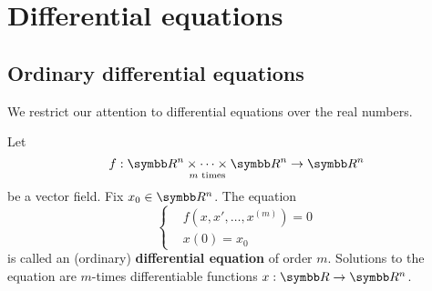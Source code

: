 \section{Differential equations}\label{sec:diffeq}
\subsection{Ordinary differential equations}\label{subsec:ordinary_differential_equations}

\begin{remark}\label{remark:real_ode}
  We restrict our attention to differential equations over the real numbers.
\end{remark}

\begin{definition}\label{def:ode}
  Let
  \begin{equation*}
    f: \underset {m \text{ times}} {\R^n \times \cdots \times \R^n} \to \R^n
  \end{equation*}
  be a vector field. Fix \( x_0 \in \R^n \). The equation
  \begin{equation*}
    \begin{cases}
      &f(x, x', \ldots, x^{(m)}) = 0 \\
      &x(0) = x_0
    \end{cases}
  \end{equation*}
  is called an (ordinary) \textbf{differential equation} of order \( m \). Solutions to the equation are \( m \)-times differentiable functions \( x: \R \to \BB{R^n} \).
\end{definition}
